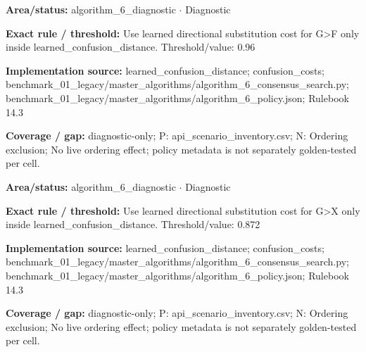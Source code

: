 \begin{tcolorbox}[enhanced,breakable,colback=white,colframe=Muted!45,boxrule=0.45pt,arc=1.5pt,left=6pt,right=6pt,top=5pt,bottom=5pt,title={\texttt{A6-LEARNED-SUBSTITUTION-G-F}},title after break={\texttt{A6-LEARNED-SUBSTITUTION-G-F}\ (continued)},fonttitle=\headingfont\bfseries\color{Navy},coltitle=Navy]
\textbf{Area/status:} algorithm\_\allowbreak{}6\_\allowbreak{}diagnostic $\boldsymbol{\cdot}$ Diagnostic\par
\smallskip
\textbf{Exact rule / threshold:} Use learned directional substitution cost for G>F only inside learned\_\allowbreak{}confusion\_\allowbreak{}distance. Threshold/\allowbreak{}value: 0.96\par
\smallskip
\textbf{Implementation source:} learned\_\allowbreak{}confusion\_\allowbreak{}distance; confusion\_\allowbreak{}costs; benchmark\_\allowbreak{}01\_\allowbreak{}legacy/\allowbreak{}master\_\allowbreak{}algorithms/\allowbreak{}algorithm\_\allowbreak{}6\_\allowbreak{}consensus\_\allowbreak{}search.py; benchmark\_\allowbreak{}01\_\allowbreak{}legacy/\allowbreak{}master\_\allowbreak{}algorithms/\allowbreak{}algorithm\_\allowbreak{}6\_\allowbreak{}policy.json; Rulebook 14.3\par
\smallskip
\textbf{Coverage / gap:} diagnostic-only; P: api\_\allowbreak{}scenario\_\allowbreak{}inventory.csv; N: Ordering exclusion; No live ordering effect; policy metadata is not separately golden-tested per cell.
\end{tcolorbox}
\begin{tcolorbox}[enhanced,breakable,colback=white,colframe=Muted!45,boxrule=0.45pt,arc=1.5pt,left=6pt,right=6pt,top=5pt,bottom=5pt,title={\texttt{A6-LEARNED-SUBSTITUTION-G-X}},title after break={\texttt{A6-LEARNED-SUBSTITUTION-G-X}\ (continued)},fonttitle=\headingfont\bfseries\color{Navy},coltitle=Navy]
\textbf{Area/status:} algorithm\_\allowbreak{}6\_\allowbreak{}diagnostic $\boldsymbol{\cdot}$ Diagnostic\par
\smallskip
\textbf{Exact rule / threshold:} Use learned directional substitution cost for G>X only inside learned\_\allowbreak{}confusion\_\allowbreak{}distance. Threshold/\allowbreak{}value: 0.872\par
\smallskip
\textbf{Implementation source:} learned\_\allowbreak{}confusion\_\allowbreak{}distance; confusion\_\allowbreak{}costs; benchmark\_\allowbreak{}01\_\allowbreak{}legacy/\allowbreak{}master\_\allowbreak{}algorithms/\allowbreak{}algorithm\_\allowbreak{}6\_\allowbreak{}consensus\_\allowbreak{}search.py; benchmark\_\allowbreak{}01\_\allowbreak{}legacy/\allowbreak{}master\_\allowbreak{}algorithms/\allowbreak{}algorithm\_\allowbreak{}6\_\allowbreak{}policy.json; Rulebook 14.3\par
\smallskip
\textbf{Coverage / gap:} diagnostic-only; P: api\_\allowbreak{}scenario\_\allowbreak{}inventory.csv; N: Ordering exclusion; No live ordering effect; policy metadata is not separately golden-tested per cell.
\end{tcolorbox}
